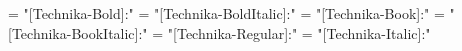

\ifx\font\corkencoded 
\fi

\ifx\font\unicoded  %

   \font\tenbf  = "[\fontdir Technika-Bold]:\fontfeatures"   
   \font\tenbi  = "[\fontdir Technika-BoldItalic]:\fontfeatures"      
   \font\tenss  = "[\fontdir Technika-Book]:\fontfeatures"     
   \font\tenssi = "[\fontdir Technika-BookItalic]:\fontfeatures" 
   \font\tensbf = "[\fontdir Technika-Regular]:\fontfeatures" 
   \font\tensbi = "[\fontdir Technika-Italic]:\fontfeatures" 

   \let\ffnamegen=\undefined

\else  %




\fi

\def\bf{\fam\bffam\tenbf\thefontscale[920]}
\def\bi{\fam\bifam\tenbi\thefontscale[920]}
\def\ssr{\tenss\thefontscale[920]} 
\def\ssi{\tenssi\thefontscale[920]}
\def\sbf{\fam\bffam\tensbf\thefontscale[920]}
\def\sbi{\fam\bifam\tensbi\thefontscale[920]}
\def\titbf{\tenbf\thefontscale[920]\boldmath}

\let\serifbf=\tenbf \let\serifbi=\tenbi
\regfont\tenss \regfont\tenssi \regfont\tenrmc
\def\sc{\tenrmc}
\def\textit#1{{\em#1}} \def\textsc#1{{\sc#1}}

\def\bfshape{\let\tenit=\tenbi \let\tenss=\tenbf \let\tenssi=\tenbi
   \everymath\expandafter{\boldmath}\tenbf\thefontscale[920]
}

